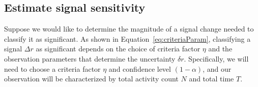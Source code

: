 \documentclass{article}
\begin{document}
%
%
%



\subsection{Estimate signal sensitivity}

Suppose we would like to determine the magnitude of a signal change needed to 
classify it as significant. As shown in Equation~\ref{eq:criteriaParam}, 
classifying a signal $\Delta r$ as significant depends on the choice of criteria factor 
$\eta$ and the observation parameters that determine the uncertainty $\delta r$. 
Specifically, we will need to choose a criteria factor $\eta$ and confidence level 
$(1-\alpha)$, and our observation will be characterized by total activity count $N$ 
and total time $T$.
\end{document}
